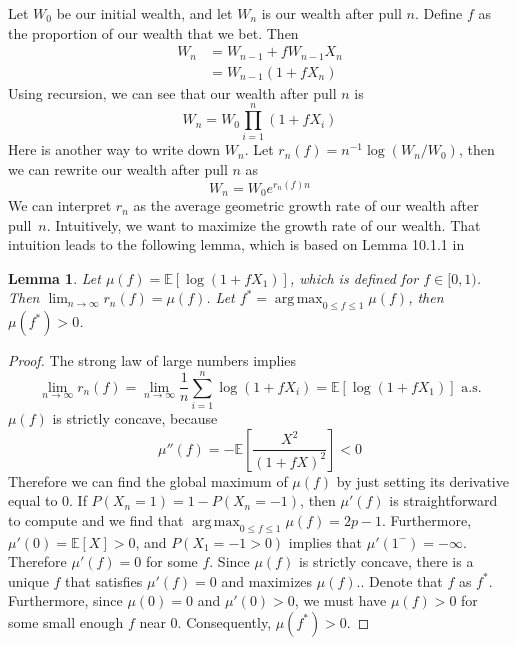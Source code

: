 \documentclass[letterpaper]{article}
\DeclareMathOperator*{\argmax}{arg\,max}
\numberwithin{equation}{section}
\theoremstyle{plain}
\newtheorem{lemma}{Lemma}[section]
\begin{document}
Let $W_0$ be our initial wealth, and let $W_n$ is our wealth after pull $n$. Define $f$ as the proportion of our wealth that we bet. Then
\begin{align}
W_n &= W_{n-1} +fW_{n-1} X_n\\
&= W_{n-1} (1+fX_n)
\end{align}
Using recursion, we can see that our wealth after pull $n$ is
\begin{equation}
W_n = W_0 \prod_{i=1}^n (1+f X_i)
\end{equation}
Here is another way to write down $W_n$. Let $r_n(f) = n^{-1} \log (W_n / W_0)$, then we can rewrite our wealth after pull $n$ as
\begin{equation}
W_n = W_0 e^{r_n(f) n}
\end{equation}
We can interpret $r_n$ as the average geometric growth rate of our wealth after pull~$n$. Intuitively, we want to maximize the growth rate of our wealth. That intuition leads to the following lemma, which is based on Lemma 10.1.1 in \cite{ethier2010doctrine}
\begin{lemma}\label{lemma:kelly_asymp_growth}
Let $\mu(f) = \mathbb{E}[\log(1+fX_1)]$, which is defined for $f\in[0, 1)$. Then $\lim_{n\to\infty} r_n(f) = \mu(f)$. Let $f^* = \argmax_{0\le f\le 1} \mu(f)$, then $\mu(f^*) > 0$.
\end{lemma}
\begin{proof}
The strong law of large numbers implies
\begin{equation}
\lim_{n\to\infty}  r_n(f) = \lim_{n\to\infty} \frac{1}{n} \sum_{i=1}^n \log(1+f X_i) = \mathbb{E}[\log(1+fX_1)] \text{ a.s.}
\end{equation}
$\mu(f)$ is strictly concave, because
\begin{equation}
\mu''(f) = -\mathbb{E}\left[\frac{X^2}{(1+fX)^2}\right] < 0
\end{equation}
Therefore we can find the global maximum of $\mu(f)$ by just setting its derivative equal to 0. If $P(X_n = 1) = 1-P(X_n=-1)$, then $\mu'(f)$ is straightforward to compute and we find that $\argmax_{0\le f\le 1}\mu(f) = 2p-1$. Furthermore, $\mu'(0) =\mathbb{E}[X] > 0$, and $P(X_1 = -1 > 0)$ implies that $\mu'(1^-) = -\infty$. Therefore $\mu'(f) = 0$ for some $f$. Since $\mu(f)$ is strictly concave, there is a unique $f$ that satisfies $\mu'(f) = 0$ and maximizes $\mu(f)$.. Denote that $f$ as $f^*$. Furthermore, since $\mu(0) = 0$ and $\mu'(0) > 0$, we must have $\mu(f) > 0$ for some small enough $f$ near 0. Consequently, $\mu(f^*) > 0$.
\end{proof}
\end{document}
